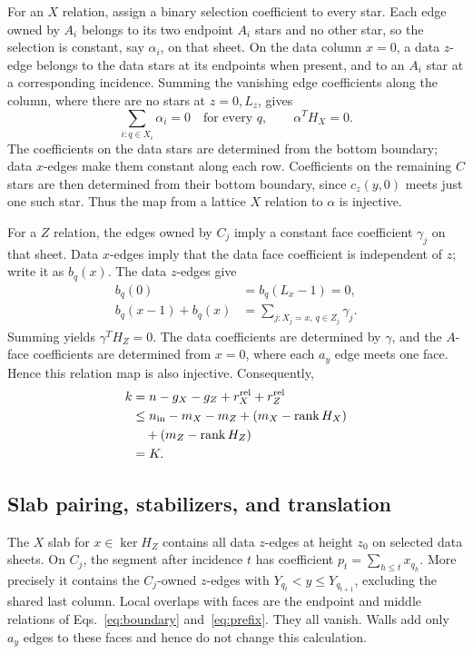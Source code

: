 For an $X$ relation, assign a binary selection coefficient to every star.
Each edge owned by $A_i$ belongs to its two endpoint $A_i$ stars and no
other star, so the selection is constant, say $\alpha_i$, on that sheet.
On the data column $x=0$, a data $z$-edge belongs to the data stars at its
endpoints when present, and to an $A_i$ star at a corresponding incidence.
Summing the vanishing edge coefficients along the column, where there are
no stars at $z=0,L_z$, gives
\begin{equation}
 \sum_{i:q\in X_i}\alpha_i=0\quad\text{for every }q,
 \qquad \alpha^TH_X=0.
\end{equation}
The coefficients on the data stars are determined from the bottom
boundary; data $x$-edges make them constant along each row. Coefficients
on the remaining $C$ stars are then determined from their bottom
boundary, since $c_z(y,0)$ meets just one such star. Thus the map from a
lattice $X$ relation to $\alpha$ is injective.

For a $Z$ relation, the edges owned by $C_j$ imply a constant face
coefficient $\gamma_j$ on that sheet. Data $x$-edges imply that the data
face coefficient is independent of $z$; write it as $b_q(x)$.
The data $z$-edges give
\begin{align}
 b_q(0)&=b_q(L_x-1)=0,\nonumber\\
 b_q(x-1)+b_q(x)&=\sum_{j:X_j=x,\ q\in Z_j}\gamma_j.
\end{align}
Summing yields $\gamma^TH_Z=0$. The data coefficients are determined by
$\gamma$, and the $A$-face coefficients are determined from $x=0$, where
each $a_y$ edge meets one face. Hence this relation map is also injective.
Consequently,
\begin{align}
 k&=n-g_X-g_Z+r_X^{\rm rel}+r_Z^{\rm rel}\nonumber\\
 &\le n_{\rm in}-m_X-m_Z+(m_X-\operatorname{rank} H_X)\nonumber\\
 &\quad +(m_Z-\operatorname{rank} H_Z)\nonumber\\
 &=K.
 \label{eq:rank-upper}
\end{align}

\subsection{Slab pairing, stabilizers, and translation}
The $X$ slab for $x\in\ker H_Z$ contains all data $z$-edges at height
$z_0$ on selected data sheets. On $C_j$, the segment after incidence $t$
has coefficient $p_t=\sum_{h\le t}x_{q_h}$. More precisely it contains
the $C_j$-owned $z$-edges with $Y_{q_t}<y\le Y_{q_{t+1}}$, excluding
the shared last column. Local overlaps with faces are the endpoint and
middle relations of Eqs.~\eqref{eq:boundary} and~\eqref{eq:prefix}.
They all vanish. Walls add only $a_y$ edges to these faces and hence
do not change this calculation.

